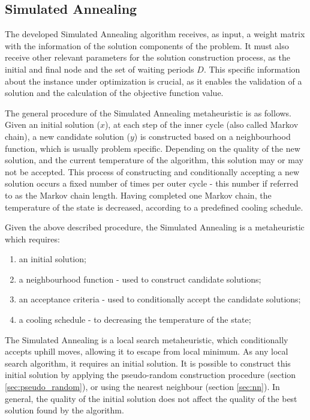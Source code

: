 \subsection{Simulated Annealing}
\label{sec:sa}

The developed Simulated Annealing algorithm receives, as input, a weight matrix with the information of the solution components of the problem. It must also receive other relevant parameters for the solution construction process, as the initial and final node and the set of waiting periods $D$. This specific information about the instance under optimization is crucial, as it enables the validation of a solution and the calculation of the objective function value.

The general procedure of the Simulated Annealing metaheuristic is as follows. Given an initial solution ($x$), at each step of the inner cycle (also called Markov chain), a new candidate solution ($y$) is constructed based on a neighbourhood function, which is usually problem specific. Depending on the quality of the new solution, and the current temperature of the algorithm, this solution may or may not be accepted. This process of constructing and conditionally accepting a new solution occurs a fixed number of times per outer cycle - this number if referred to as the Markov chain length. Having completed one Markov chain, the temperature of the state is decreased, according to a predefined cooling schedule.

Given the above described procedure, the Simulated Annealing is a metaheuristic which requires:
\begin{enumerate}
    \item an initial solution;
    \item a neighbourhood function - used to construct candidate solutions; 
    \item an acceptance criteria - used to conditionally accept the candidate solutions;
    \item a cooling schedule - to decreasing the temperature of the state;
\end{enumerate}


The Simulated Annealing is a local search metaheuristic, which conditionally accepts uphill moves, allowing it to escape from local minimum. As any local search algorithm, it requires an initial solution.  It is possible to construct this initial solution by applying the pseudo-random construction procedure (section \ref{sec:pseudo_random}), or using the nearest neighbour (section \ref{sec:nn}). In general, the quality of the initial solution does not affect the quality of the best solution found by the algorithm.

